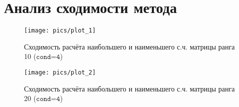 \section{Анализ сходимости метода}
\begin{figure}[H]
    \centering
    \caption{Сходимость расчёта наибольшего и наименьшего с.ч. матрицы ранга 10 ($\texttt{cond=4}$)}
    \texttt{[image: pics/plot\_1]}
\end{figure}
\begin{figure}[H]
    \centering
    \caption{Сходимость расчёта наибольшего и наименьшего с.ч. матрицы ранга 20 ($\texttt{cond=4}$)}
    \texttt{[image: pics/plot\_2]}
\end{figure}